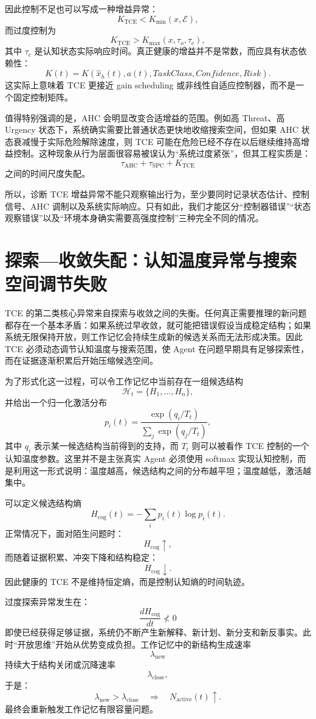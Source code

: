 因此控制不足也可以写成一种增益异常：
\[
K_{\mathrm{TCE}}<K_{\min}(x,\mathcal E),
\]
而过度控制为
\[
K_{\mathrm{TCE}}>K_{\max}(x,\tau_o,\tau_c),
\]
其中 \(\tau_c\) 是认知状态实际响应时间。真正健康的增益并不是常数，而应具有状态依赖性：
\[
K(t)
=
K\left(
\hat x_h(t),
a(t),
TaskClass,
Confidence,
Risk
\right).
\]
这实际上意味着 TCE 更接近 gain scheduling 或非线性自适应控制器，而不是一个固定控制矩阵。

值得特别强调的是，AHC 会明显改变合适增益的范围。例如高 Threat、高 Urgency 状态下，系统确实需要比普通状态更快地收缩搜索空间，但如果 AHC 状态衰减慢于实际危险解除速度，则 TCE 可能在危险已经不存在以后继续维持高增益控制。这种现象从行为层面很容易被误认为“系统过度紧张”，但其工程实质是：
\[
\tau_{\mathrm{AHC}}
+
\tau_{\mathrm{SPC}}
+
K_{\mathrm{TCE}}
\]
之间的时间尺度失配。

所以，诊断 TCE 增益异常不能只观察输出行为，至少要同时记录状态估计、控制信号、AHC 调制以及系统实际响应。只有如此，我们才能区分“控制器错误”“状态观察错误”以及“环境本身确实需要高强度控制”三种完全不同的情况。

\section{探索—收敛失配：认知温度异常与搜索空间调节失败}

TCE 的第二类核心异常来自探索与收敛之间的失衡。任何真正需要推理的新问题都存在一个基本矛盾：如果系统过早收敛，就可能把错误假设当成稳定结构；如果系统无限保持开放，则工作记忆会持续生成新的候选关系而无法形成决策。因此 TCE 必须动态调节认知温度与搜索范围，使 Agent 在问题早期具有足够探索性，而在证据逐渐积累后开始压缩候选空间。

为了形式化这一过程，可以令工作记忆中当前存在一组候选结构
\[
\mathcal H_t
=
\{H_1,\ldots,H_n\},
\]
并给出一个归一化激活分布
\[
p_i(t)
=
\frac{\exp(q_i/T_t)}
{\sum_j\exp(q_j/T_t)},
\]
其中 \(q_i\) 表示某一候选结构当前得到的支持，而 \(T_t\) 则可以被看作 TCE 控制的一个认知温度参数。这里并不是主张真实 Agent 必须使用 softmax 实现认知控制，而是利用这一形式说明：温度越高，候选结构之间的分布越平坦；温度越低，激活越集中。

可以定义候选结构熵
\[
H_{\mathrm{cog}}(t)
=
-\sum_i p_i(t)\log p_i(t).
\]
正常情况下，面对陌生问题时：
\[
H_{\mathrm{cog}}\uparrow,
\]
而随着证据积累、冲突下降和结构稳定：
\[
H_{\mathrm{cog}}\downarrow.
\]
因此健康的 TCE 不是维持恒定熵，而是控制认知熵的时间轨迹。

过度探索异常发生在：
\[
\frac{dH_{\mathrm{cog}}}{dt}
\not<0
\]
即使已经获得足够证据，系统仍不断产生新解释、新计划、新分支和新反事实。此时“开放思维”开始从优势变成负担。工作记忆中的新结构生成速率
\[
\lambda_{\mathrm{new}}
\]
持续大于结构关闭或沉降速率
\[
\lambda_{\mathrm{close}},
\]
于是：
\[
\lambda_{\mathrm{new}}
>
\lambda_{\mathrm{close}}
\quad\Rightarrow\quad
N_{\mathrm{active}}(t)\uparrow.
\]
最终会重新触发工作记忆有限容量问题。

